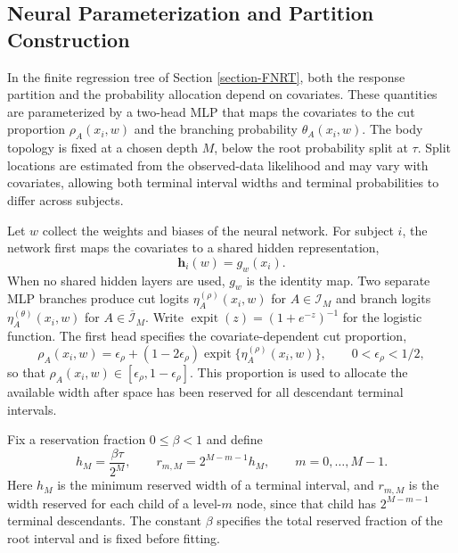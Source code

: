 \documentclass[11pt]{article}
\numberwithin{equation}{section}
\begin{document}
\subsection{Neural Parameterization and Partition Construction}
\label{section-neural-parameterization}
In the finite regression tree of Section \ref{section-FNRT}, both the response partition and the probability allocation depend on covariates. These quantities are parameterized by a two-head MLP that maps the covariates to the cut proportion $\rho_A(x_i,w)$ and the branching probability $\theta_A(x_i,w)$. The body topology is fixed at a chosen depth $M$, below the root probability split at $\tau$. Split locations are estimated from the observed-data likelihood and may vary with covariates, allowing both terminal interval widths and terminal probabilities to differ across subjects.

Let $w$ collect the weights and biases of the neural network. For subject $i$, the network first maps the covariates to a shared hidden representation,
$$
    \bm h_i(w)=g_w(x_i).
$$
When no shared hidden layers are used, $g_w$ is the identity map. Two separate MLP branches produce cut logits $\eta_A^{(\rho)}(x_i,w)$ for $A\in\mathcal I_M$ and branch logits $\eta_A^{(\theta)}(x_i,w)$ for $A\in\overline{\mathcal I}_M$. Write $\operatorname{expit}(z)=(1+e^{-z})^{-1}$ for the logistic function. The first head specifies the covariate-dependent cut proportion,
\begin{equation}
    \label{eq:cut_prop}
    \rho_A(x_i,w)
    =
    \epsilon_\rho + (1-2\epsilon_\rho) \operatorname{expit}\{\eta_A^{(\rho)}(x_i,w)\},
    \qquad 0 < \epsilon_\rho < 1/2,
\end{equation}
so that $\rho_A(x_i,w)\in[\epsilon_\rho,1-\epsilon_\rho]$. This proportion is used to allocate the available width after space has been reserved for all descendant terminal intervals.

Fix a reservation fraction $0\leq\beta<1$ and define
\begin{equation}
    h_M=\frac{\beta\tau}{2^M},\qquad
    r_{m,M}=2^{M-m-1}h_M,\qquad m=0,\ldots,M-1.
    \label{eq:width-reservation}
\end{equation}
Here $h_M$ is the minimum reserved width of a terminal interval, and $r_{m,M}$ is the width reserved for each child of a level-$m$ node, since that child has $2^{M-m-1}$ terminal descendants. The constant $\beta$ specifies the total reserved fraction of the root interval and is fixed before fitting. 
\end{document}
